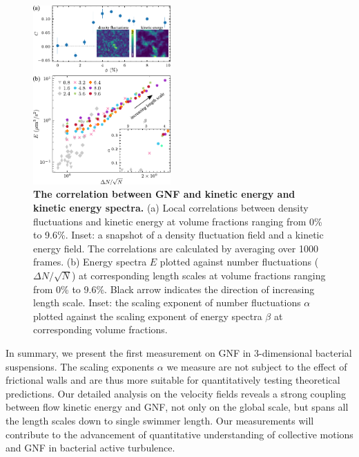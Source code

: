 \documentclass[twocolumn,aps,prl,amsmath,amssymb,longbibliography]{revtex4-2}
\begin{document}
\begin{figure}[!]
\begin{center}
\includegraphics[width=0.47\textwidth]{figures/GNF-energy-spectra-correlation/v1.pdf}
\caption[The correlation between GNF and kinetic energy and kinetic energy spectra.]
{
\textbf{The correlation between GNF and kinetic energy and kinetic energy spectra.}
(a) Local correlations between density fluctuations and kinetic energy at volume fractions ranging from 0\% to 9.6\%. Inset: a snapshot of a density fluctuation field and a kinetic energy field. The correlations are calculated by averaging over 1000 frames.
(b) Energy spectra $E$ plotted against number fluctuations ($\Delta N/\sqrt N$) at corresponding length scales at volume fractions ranging from 0\% to 9.6\%. Black arrow indicates the direction of increasing length scale. Inset: the scaling exponent of number fluctuations $\alpha$ plotted against the scaling exponent of energy spectra $\beta$ at corresponding volume fractions.
}
\label{fig:GNF-energy-spectra-correlation}
\end{center}
\end{figure}





In summary, we present the first measurement on GNF in 3-dimensional bacterial suspensions. The scaling exponents $\alpha$ we measure are not subject to the effect of frictional walls and are thus more suitable for quantitatively testing theoretical predictions.
Our detailed analysis on the velocity fields reveals a strong coupling between flow kinetic energy and GNF, not only on the global scale, but spans all the length scales down to single swimmer length.
Our measurements will contribute to the advancement of quantitative understanding of collective motions and GNF in bacterial active turbulence.



\end{document}
